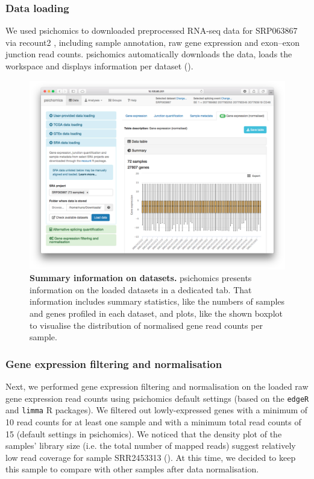 \subsubsection{Data loading}

We used psichomics to downloaded preprocessed RNA-seq data for SRP063867 via recount2 \cite{collado-torres:2017uw}, including sample annotation, raw gene expression and exon–exon junction read counts. psichomics automatically downloads the data, loads the workspace and displays information per dataset ().

\begin{figure}[!h]
  \includegraphics[width=.9\textwidth]{images/psichomics/0-gene-expr-summary}
  \centering
  \caption[Summary information on datasets]{\textbf{Summary information on datasets.} psichomics presents information on the loaded datasets in a dedicated tab. That information includes summary statistics, like the numbers of samples and genes profiled in each dataset, and plots, like the shown boxplot to visualise the distribution of normalised gene read counts per sample.}
  \label{fig:psichomics-gene-expr-summary}
\end{figure}

\subsubsection{Gene expression filtering and normalisation}

Next, we performed gene expression filtering and normalisation on the loaded raw gene expression read counts using psichomics default settings (based on the \texttt{edgeR} \cite{robinson:2010wx} and \texttt{limma} \cite{ritchie:2015tm} R packages). We filtered out lowly-expressed genes with a minimum of 10 read counts for at least one sample and with a minimum total read counts of 15 (default settings in psichomics). We noticed that the density plot of the samples’ library size (i.e. the total number of mapped reads) suggest relatively low read coverage for sample SRR2453313 (). At this time, we decided to keep this sample to compare with other samples after data normalisation.

